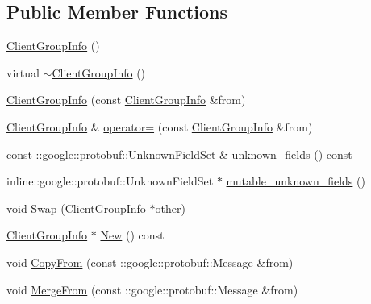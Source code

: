 \subsection*{Public Member Functions}
\begin{DoxyCompactItemize}
\item 
\hyperlink{class_i_m_1_1_base_define_1_1_client_group_info_ac2a8ff98b091c89f5467da6b9e7405bc}{Client\+Group\+Info} ()
\item 
virtual \hyperlink{class_i_m_1_1_base_define_1_1_client_group_info_a43b26e81ee0e06861ad0f3a9d6ca49e8}{$\sim$\+Client\+Group\+Info} ()
\item 
\hyperlink{class_i_m_1_1_base_define_1_1_client_group_info_aea09c997f29c4c1ca31fd58b53b00508}{Client\+Group\+Info} (const \hyperlink{class_i_m_1_1_base_define_1_1_client_group_info}{Client\+Group\+Info} \&from)
\item 
\hyperlink{class_i_m_1_1_base_define_1_1_client_group_info}{Client\+Group\+Info} \& \hyperlink{class_i_m_1_1_base_define_1_1_client_group_info_a901394f5e4c8b5566c533affa11b42fb}{operator=} (const \hyperlink{class_i_m_1_1_base_define_1_1_client_group_info}{Client\+Group\+Info} \&from)
\item 
const \+::google\+::protobuf\+::\+Unknown\+Field\+Set \& \hyperlink{class_i_m_1_1_base_define_1_1_client_group_info_adbd280c372c92d736adfe18aae88435c}{unknown\+\_\+fields} () const 
\item 
inline\+::google\+::protobuf\+::\+Unknown\+Field\+Set $\ast$ \hyperlink{class_i_m_1_1_base_define_1_1_client_group_info_ae420d7f25e80ff7014de2941f7b56da4}{mutable\+\_\+unknown\+\_\+fields} ()
\item 
void \hyperlink{class_i_m_1_1_base_define_1_1_client_group_info_ab2d4933ae54ff0206520766102fcc576}{Swap} (\hyperlink{class_i_m_1_1_base_define_1_1_client_group_info}{Client\+Group\+Info} $\ast$other)
\item 
\hyperlink{class_i_m_1_1_base_define_1_1_client_group_info}{Client\+Group\+Info} $\ast$ \hyperlink{class_i_m_1_1_base_define_1_1_client_group_info_a7962061242f13c9d8271795d4523d8eb}{New} () const 
\item 
void \hyperlink{class_i_m_1_1_base_define_1_1_client_group_info_a7b5033e8d370c58fb30433a42ff6266e}{Copy\+From} (const \+::google\+::protobuf\+::\+Message \&from)
\item 
void \hyperlink{class_i_m_1_1_base_define_1_1_client_group_info_adc76e2b57ef6bee51dd8da5bd52d2796}{Merge\+From} (const \+::google\+::protobuf\+::\+Message \&from)
\item 

\end{DoxyCompactItemize}
